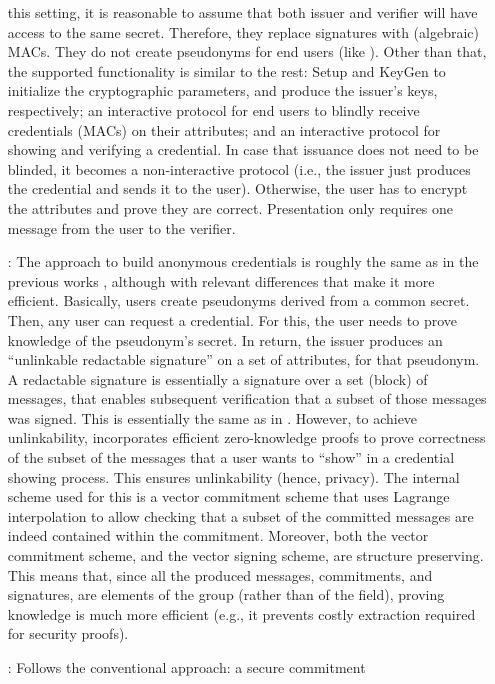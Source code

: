 \begin{enumerate}
  this setting, it is reasonable to assume that both issuer and verifier
  will have access to the same secret. Therefore, they replace signatures
  with (algebraic) MACs. They do not create pseudonyms for end users (like
  \cite{sms+19}). Other than that, the supported functionality is similar
  to the rest: Setup and KeyGen to initialize the cryptographic parameters,
  and produce the issuer's keys, respectively; an interactive protocol for
  end users to blindly receive credentials (MACs) on their attributes; and
  an interactive protocol for showing and verifying a credential. In case
  that issuance does not need to be blinded, it becomes a non-interactive
  protocol (i.e., the issuer just produces the credential and sends it to
  the user). Otherwise, the user has to encrypt the attributes and prove
  they are correct. Presentation only requires one message from the user
  to the verifier.
\item[\cite{cdhk15}:] The approach to build anonymous credentials is roughly
  the same as in the previous works \cite{cl01,cl02,cl04}, although with
  relevant differences that make it more efficient. Basically, users create
  pseudonyms derived from a common secret. Then, any user can request a
  credential. For this, the user needs to prove knowledge of the pseudonym's
  secret. In return, the issuer produces an ``unlinkable redactable signature''
  on a set of attributes, for that pseudonym. A redactable signature is
  essentially a signature over a set (block) of messages, that enables
  subsequent verification that a subset of those messages was signed. This
  is essentially the same as in \cite{cl02,cl04}. However, to achieve
  unlinkability, \cite{cdhk15} incorporates efficient zero-knowledge proofs
  to prove correctness of the subset of the messages that a user wants to
  ``show'' in a credential showing process. This ensures unlinkability (hence,
  privacy). The internal scheme used for this is a vector commitment scheme
  that uses Lagrange interpolation to allow checking that a subset of the
  committed messages are indeed contained within the commitment. Moreover,
  both the vector commitment scheme, and the vector signing scheme, are
  structure preserving. This means that, since all the produced messages,
  commitments, and signatures, are elements of the group (rather than of the
  field), proving knowledge is much more efficient (e.g., it prevents costly
  extraction required for security proofs).
\item[\cite{ckl+15}:] Follows the conventional approach: a secure commitment

\end{enumerate}
